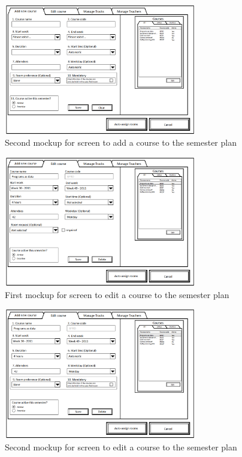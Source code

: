 \begin{figure}[htb]
\begin{center}
\leavevmode
\includegraphics[width=0.75\textwidth]{images/courseplan2_addcourse}
\end{center}
\caption{Second mockup for screen to add a course to the semester plan}
\label{fig:app2_mock2_1}
\end{figure}

\begin{figure}[htb]
\begin{center}
\leavevmode
\includegraphics[width=0.75\textwidth]{images/courseplan_editcourse}
\end{center}
\caption{First mockup for screen to edit a course to the semester plan}
\label{fig:app2_mock1_2}
\end{figure}

\begin{figure}[htb]
\begin{center}
\leavevmode
\includegraphics[width=0.75\textwidth]{images/courseplan2_editcourse}
\end{center}
\caption{Second mockup for screen to edit a course to the semester plan}
\label{fig:app2_mock2_2}
\end{figure}


